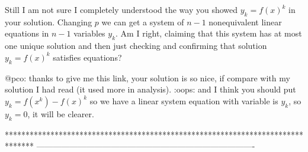 


\begin{solution}
	Still I am not sure I completely understood the way you showed $ y_{k}=f(x)^{k}$ in your solution. Changing $ p$ we can get a system of $ n-1$ nonequivalent linear equations in $ n-1$ variables $ y_{k}$. Am I right, claiming that this system has at most one unique solution and then just checking and confirming that solution $ y_{k}=f(x)^{k}$ satisfies equations?
\end{solution}



\begin{solution}
	@pco: thanks to give me this link, your solution is so nice, if compare with my solution I had read (it used more in analysis). :oops:
and I think you should put $ y_k=f(x^k)-f(x)^k$ so we have a linear system equation with variable is $ y_k$, so $ y_k=0$, it will be clearer. 
\end{solution}
*******************************************************************************
-------------------------------------------------------------------------------

